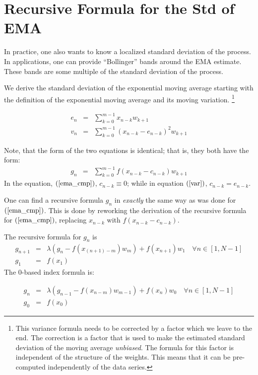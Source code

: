 \documentclass{article}
\begin{document}
\section{Recursive Formula for the Std of EMA}
In practice, one also wants to know a localized standard deviation of the process.
In applications, one can provide ``Bollinger'' bands around the EMA estimate.
These bands are some multiple of the standard deviation of the process.

We derive the standard deviation of the exponential moving average starting
with the definition of the exponential moving average and its moving variation.%
\footnote{This variance formula needs to be corrected by a factor which we 
leave to the end. The correction is a factor that is used to make the 
estimated standard deviation of the moving average {\em unbiased\/}.
The formula for this factor is independent of the structure of the weights.
This means that it can be pre-computed independently of the data series.}

\begin{eqnarray}
    e_n &=&  \sum_{k=0}^{m-1} x_{n-k} w_{k+1} \label{ema_cmp} \\
    v_n &=&  \sum_{k=0}^{m-1} (x_{n-k} - e_{n-k})^2 w_{k+1}  \label{var} 
\end{eqnarray}

Note, that the form of the two equations is identical; that is, 
they both have the form:
\begin{eqnarray}
	g_n &=& \sum_{k=0}^{m-1} f(x_{n-k} - c_{n-k}) w_{k+1} 
\end{eqnarray}
In the equation, $(\ref{ema_cmp})$, $c_{n-k} \equiv 0$; while in equation 
$(\ref{var})$, $c_{n-k} = e_{n-k}$.

One can find a recursive formula $g_n$ in {\em exactly\/} the same way as
was done for $(\ref{ema_cmp})$. This is done by reworking the derivation of 
the recursive formula for $(\ref{ema_cmp})$, replacing $x_{n-k}$ with $f(x_{n-k} - c_{n-k})$.

The recursive formula for $g_n$ is
\begin{eqnarray}
    g_{n+1} &=&  \lambda \left( g_{n} - f(x_{(n+1)-m}) w_m \right) + f(x_{n+1}) w_1  \quad \forall n \in [1, N-1] \\
    g_1     &=&  f(x_1) 
\end{eqnarray}
The 0-based index formula is:

\begin{eqnarray}
    g_{n} &=&  \lambda \left( g_{n-1} - f(x_{n-m}) w_{m-1} \right) + f(x_{n}) w_0  \quad \forall n \in [1, N-1] \\
    g_0   &=&  f(x_0) 
\end{eqnarray}
\end{document}
